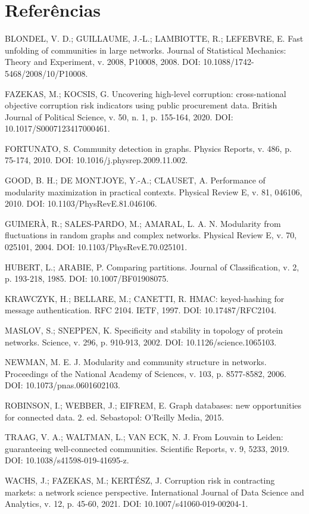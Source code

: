 \documentclass[12pt,a4paper]{article}
\begin{document}
\section*{Referências}
\begin{small}
BLONDEL, V. D.; GUILLAUME, J.-L.; LAMBIOTTE, R.; LEFEBVRE, E. Fast unfolding of communities in large networks. Journal of Statistical Mechanics: Theory and Experiment, v. 2008, P10008, 2008. DOI: 10.1088/1742-5468/2008/10/P10008.\par\smallskip
FAZEKAS, M.; KOCSIS, G. Uncovering high-level corruption: cross-national objective corruption risk indicators using public procurement data. British Journal of Political Science, v. 50, n. 1, p. 155-164, 2020. DOI: 10.1017/S0007123417000461.\par\smallskip
FORTUNATO, S. Community detection in graphs. Physics Reports, v. 486, p. 75-174, 2010. DOI: 10.1016/j.physrep.2009.11.002.\par\smallskip
GOOD, B. H.; DE MONTJOYE, Y.-A.; CLAUSET, A. Performance of modularity maximization in practical contexts. Physical Review E, v. 81, 046106, 2010. DOI: 10.1103/PhysRevE.81.046106.\par\smallskip
GUIMERÀ, R.; SALES-PARDO, M.; AMARAL, L. A. N. Modularity from fluctuations in random graphs and complex networks. Physical Review E, v. 70, 025101, 2004. DOI: 10.1103/PhysRevE.70.025101.\par\smallskip
HUBERT, L.; ARABIE, P. Comparing partitions. Journal of Classification, v. 2, p. 193-218, 1985. DOI: 10.1007/BF01908075.\par\smallskip
KRAWCZYK, H.; BELLARE, M.; CANETTI, R. HMAC: keyed-hashing for message authentication. RFC 2104. IETF, 1997. DOI: 10.17487/RFC2104.\par\smallskip
MASLOV, S.; SNEPPEN, K. Specificity and stability in topology of protein networks. Science, v. 296, p. 910-913, 2002. DOI: 10.1126/science.1065103.\par\smallskip
NEWMAN, M. E. J. Modularity and community structure in networks. Proceedings of the National Academy of Sciences, v. 103, p. 8577-8582, 2006. DOI: 10.1073/pnas.0601602103.\par\smallskip
ROBINSON, I.; WEBBER, J.; EIFREM, E. Graph databases: new opportunities for connected data. 2. ed. Sebastopol: O'Reilly Media, 2015.\par\smallskip
TRAAG, V. A.; WALTMAN, L.; VAN ECK, N. J. From Louvain to Leiden: guaranteeing well-connected communities. Scientific Reports, v. 9, 5233, 2019. DOI: 10.1038/s41598-019-41695-z.\par\smallskip
WACHS, J.; FAZEKAS, M.; KERTÉSZ, J. Corruption risk in contracting markets: a network science perspective. International Journal of Data Science and Analytics, v. 12, p. 45-60, 2021. DOI: 10.1007/s41060-019-00204-1.\par\smallskip
\end{small}
\end{document}

